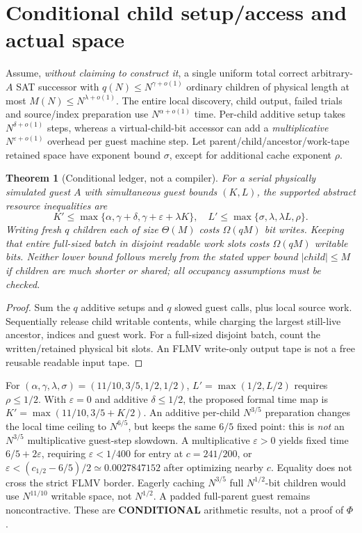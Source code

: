 \documentclass[10pt]{article}
\newtheorem{theorem}{Theorem}
\begin{document}
\section{Conditional child setup/access and actual space}
Assume, \emph{without claiming to construct it}, a single uniform total correct arbitrary-$A$ SAT successor with $q(N)\le N^{\gamma+o(1)}$ ordinary children of physical length at most $M(N)\le N^{\lambda+o(1)}$. The entire local discovery, child output, failed trials and source/index preparation use $N^{\alpha+o(1)}$ time. Per-child additive setup takes $N^{\delta+o(1)}$ steps, whereas a virtual-child-bit accessor can add a \emph{multiplicative} $N^{\varepsilon+o(1)}$ overhead per guest machine step. Let parent/child/ancestor/work-tape retained space have exponent bound $\sigma$, except for additional cache exponent $\rho$.
\begin{theorem}[Conditional ledger, not a compiler]
For a serial physically simulated guest $A$ with simultaneous guest bounds $(K,L)$, the supported abstract resource inequalities are
\[
K'\le\max\{\alpha,\gamma+\delta,\gamma+\varepsilon+\lambda K\},
\quad L'\le\max\{\sigma,\lambda,\lambda L,\rho\}.
\]
Writing fresh $q$ children each of size $\Theta(M)$ costs $\Omega(qM)$ bit writes. Keeping that entire \emph{full-sized} batch in disjoint readable work slots costs $\Omega(qM)$ writable bits. Neither lower bound follows merely from the stated upper bound $|child|\le M$ if children are much shorter or shared; all occupancy assumptions must be checked.
\end{theorem}
\begin{proof}Sum the $q$ additive setups and $q$ slowed guest calls, plus local source work. Sequentially release child writable contents, while charging the largest still-live ancestor, indices and guest work. For a full-sized disjoint batch, count the written/retained physical bit slots. An FLMV write-only output tape is not a free reusable readable input tape.\end{proof}
For $(\alpha,\gamma,\lambda,\sigma)=(11/10,3/5,1/2,1/2)$, $L'=\max(1/2,L/2)$ requires $\rho\le1/2$. With $\varepsilon=0$ and additive $\delta\le1/2$, the proposed formal time map is $K'=\max(11/10,3/5+K/2)$. An additive per-child $N^{3/5}$ preparation changes the local time ceiling to $N^{6/5}$, but keeps the same $6/5$ fixed point: this is \emph{not} an $N^{3/5}$ multiplicative guest-step slowdown. A multiplicative $\varepsilon>0$ yields fixed time $6/5+2\varepsilon$, requiring $\varepsilon<1/400$ for entry at $c=241/200$, or $\varepsilon<(c_{1/2}-6/5)/2\simeq0.0027847152$ after optimizing nearby $c$. Equality does not cross the strict FLMV border. Eagerly caching $N^{3/5}$ full $N^{1/2}$-bit children would use $N^{11/10}$ writable space, not $N^{1/2}$. A padded full-parent guest remains noncontractive. These are \textbf{CONDITIONAL} arithmetic results, not a proof of $\Phi$.
\end{document}
